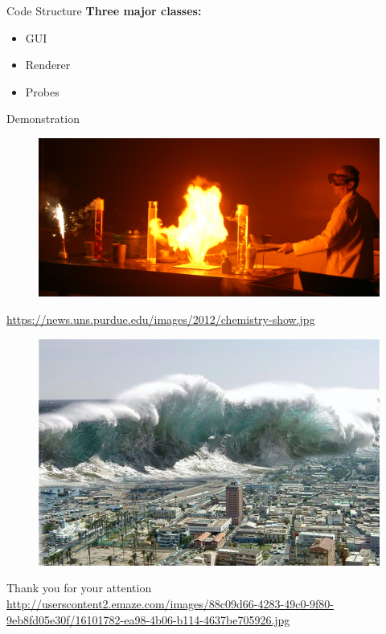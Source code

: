 \documentclass[shortpres,usenames,dvipsnames]{beamer}
\newcommand{\imgfullscale}{0.75}
\begin{document}
\begin{frame}[fragile]{Code Structure}
\textbf{Three major classes:}\\
\begin{itemize}
		\item GUI
		\item Renderer
		\item Probes
	\end{itemize}
\end{frame}

\begin{frame}[fragile]{Demonstration}
	\begin{figure}
		\includegraphics[clip, width=\linewidth]{img/demo.jpeg}
	\end{figure}
	
	\vfill
	\flushleft
	{\fontsize{5}{5} \selectfont \url{https://news.uns.purdue.edu/images/2012/chemistry-show.jpg}}
\end{frame}

\begin{frame}{}
	\begin{figure}
		\includegraphics[clip, width=\imgfullscale\linewidth]{img/tsunami.jpg}
	\end{figure}
	\centering
	\vspace{10pt}
	Thank you for your attention
	\\
	\vfill
	\flushleft
	{\fontsize{5}{5} \selectfont \url{http://userscontent2.emaze.com/images/88c09d66-4283-49c0-9f80-9eb8fd05e30f/16101782-ea98-4b06-b114-4637be705926.jpg}}
\end{frame}
\end{document}
